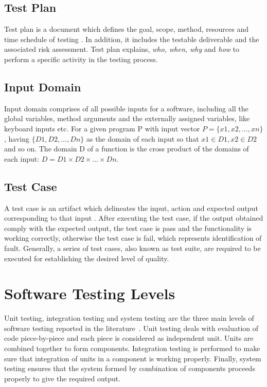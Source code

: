 \subsection{Test Plan}
Test plan is a document which defines the goal, scope, method, resources and time schedule of testing \cite{futrell2001quality}. In addition, it includes the testable deliverable and the associated risk assessment. Test plan explains, {\it {who, when, why}} and {\it {how}} to perform a specific activity in the testing process. 

\subsection{Input Domain} 
Input domain comprises of all possible inputs for a software, including all the global variables, method arguments and the externally assigned variables, like keyboard inputs etc. For a given program P with input vector $ P =\{x1, x2, . . . , xn\}$, having $\{D1, D2, . . . , Dn\}$ as the domain of each input so that $x1 \in D1, x2 \in D2$ and so on. The domain D of a function is the cross product of the domains of each input: $D = D1 \times D2 \times . . . \times Dn$.

\subsection{Test Case}
A test case is an artifact which delineates the input, action and expected output corresponding to that input \cite{ahmed2010software}. After executing the test case, if the output obtained comply with the expected output, the test case is pass and the functionality is working correctly, otherwise the test case is fail, which represents identification of fault. Generally, a series of test cases, also known as test suite, are required to be executed for establishing the desired level of quality.

\section{Software Testing Levels}
Unit testing, integration testing and system testing are the three main levels of software testing reported in the literature~\cite{chilenski1994applicability}. Unit testing deals with evaluation of code piece-by-piece and each piece is considered as independent unit. Units are combined together to form components. Integration testing is performed to make sure that integration of units in a component is working properly. Finally, system testing ensures that the system formed by combination of components proceeds properly to give the required output.

